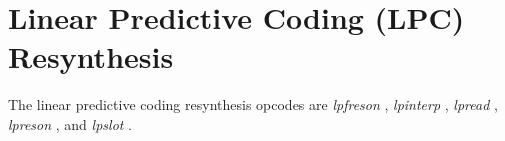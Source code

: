 \begin{comment}
\documentclass[10pt]{article}
\usepackage{fullpage, graphicx, url}
\setlength{\parskip}{1ex}
\setlength{\parindent}{0ex}
\title{Linear Predictive Coding (LPC) Resynthesis}



\begin{tabular}{ccc}
The Alternative Csound Reference Manual & & \\
Previous &Signal Generators &Next

\end{tabular}

\end{comment}
\section{Linear Predictive Coding (LPC) Resynthesis}


  The linear predictive coding resynthesis opcodes are \emph{lpfreson}
, \emph{lpinterp}
, \emph{lpread}
, \emph{lpreson}
, and \emph{lpslot}
. 


\begin{comment}
\begin{tabular}{lcr}
Previous &Home &Next \\
Linear and Exponential Generators &Up &Models and Emulations

\end{tabular}



\end{comment}
